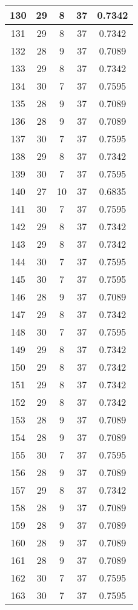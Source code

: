 \documentclass[letterpaper, 12pt]{article}
\begin{document}
\begin{longtable}{|c|c|c|c|c|}
\hline
130 & 29 & 8 & 37 & 0.7342 \\
\hline
131 & 29 & 8 & 37 & 0.7342 \\
\hline
132 & 28 & 9 & 37 & 0.7089 \\
\hline
133 & 29 & 8 & 37 & 0.7342 \\
\hline
134 & 30 & 7 & 37 & 0.7595 \\
\hline
135 & 28 & 9 & 37 & 0.7089 \\
\hline
136 & 28 & 9 & 37 & 0.7089 \\
\hline
137 & 30 & 7 & 37 & 0.7595 \\
\hline
138 & 29 & 8 & 37 & 0.7342 \\
\hline
139 & 30 & 7 & 37 & 0.7595 \\
\hline
140 & 27 & 10 & 37 & 0.6835 \\
\hline
141 & 30 & 7 & 37 & 0.7595 \\
\hline
142 & 29 & 8 & 37 & 0.7342 \\
\hline
143 & 29 & 8 & 37 & 0.7342 \\
\hline
144 & 30 & 7 & 37 & 0.7595 \\
\hline
145 & 30 & 7 & 37 & 0.7595 \\
\hline
146 & 28 & 9 & 37 & 0.7089 \\
\hline
147 & 29 & 8 & 37 & 0.7342 \\
\hline
148 & 30 & 7 & 37 & 0.7595 \\
\hline
149 & 29 & 8 & 37 & 0.7342 \\
\hline
150 & 29 & 8 & 37 & 0.7342 \\
\hline
151 & 29 & 8 & 37 & 0.7342 \\
\hline
152 & 29 & 8 & 37 & 0.7342 \\
\hline
153 & 28 & 9 & 37 & 0.7089 \\
\hline
154 & 28 & 9 & 37 & 0.7089 \\
\hline
155 & 30 & 7 & 37 & 0.7595 \\
\hline
156 & 28 & 9 & 37 & 0.7089 \\
\hline
157 & 29 & 8 & 37 & 0.7342 \\
\hline
158 & 28 & 9 & 37 & 0.7089 \\
\hline
159 & 28 & 9 & 37 & 0.7089 \\
\hline
160 & 28 & 9 & 37 & 0.7089 \\
\hline
161 & 28 & 9 & 37 & 0.7089 \\
\hline
162 & 30 & 7 & 37 & 0.7595 \\
\hline
163 & 30 & 7 & 37 & 0.7595 \\

\end{longtable}
\end{document}
